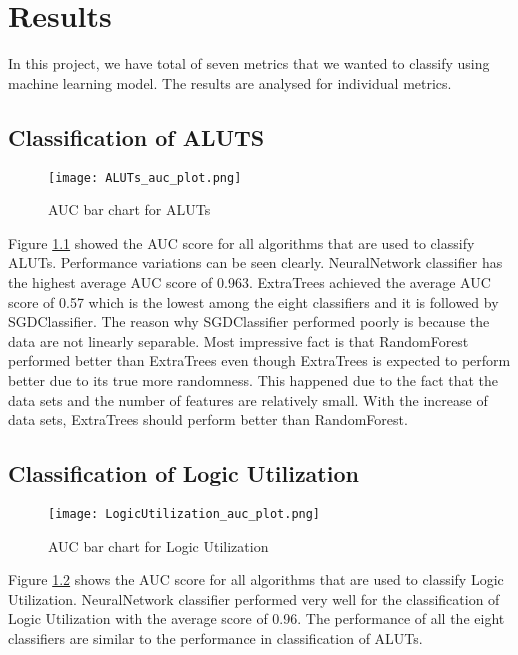 \chapter{Results}

In this project, we have total of seven metrics that we wanted to classify using machine learning model. The results are analysed for individual metrics.

\section{Classification of ALUTS}
\begin{figure}[h!]
\centering
\texttt{[image: ALUTs\_auc\_plot.png]}
\caption{AUC bar chart for ALUTs}
\label{figure:ALUTs_auc_plot}
\end{figure}

Figure \ref{figure:ALUTs_auc_plot} showed the AUC score for all algorithms that are used to classify ALUTs. Performance variations can be seen clearly. NeuralNetwork classifier has the highest average AUC score of 0.963. ExtraTrees achieved the average AUC score of 0.57 which is the lowest among the eight classifiers and it is followed by SGDClassifier. The reason why SGDClassifier performed poorly is because the data are not linearly separable. Most impressive fact is that RandomForest performed better than ExtraTrees even though ExtraTrees is expected to perform better due to its true more randomness. This happened due to the fact that the data sets and the number of features are relatively small. With the increase of data sets, ExtraTrees should perform better than RandomForest.

\section{Classification of Logic Utilization}

\begin{figure}[h!]
\centering
\texttt{[image: LogicUtilization\_auc\_plot.png]}
\caption{AUC bar chart for Logic Utilization}
\label{figure:LogicUtilization_auc_plot}
\end{figure}

Figure \ref{figure:LogicUtilization_auc_plot} shows the AUC score for all algorithms that are used to classify Logic Utilization. NeuralNetwork classifier performed very well for the classification of Logic Utilization with the average score of 0.96. The performance of all the eight classifiers are similar to the performance in classification of ALUTs.

